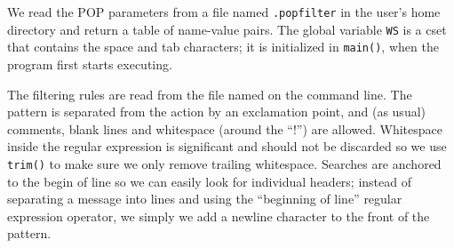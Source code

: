 We read the POP parameters from a file named \texttt{.popfilter} in the
user's home directory and return a table of name-value
pairs. The global variable \texttt{WS} is a cset that contains the
space and tab characters; it is initialized in \texttt{main()}, when
the program first starts executing.


The filtering rules are read from the file named on the command line.
The pattern is separated from the action by an exclamation point, and
(as usual) comments, blank lines and whitespace (around the
{\textquotedblleft}!{\textquotedblright}) are allowed. Whitespace
inside the regular expression is significant and should not be
discarded so we use \texttt{trim()} to make sure we only remove
trailing whitespace. Searches are anchored to the begin of line so we
can easily look for individual headers; instead of separating a message
into lines and using the {\textquotedblleft}beginning of
line{\textquotedblright} regular expression operator, we simply we add
a newline character to the front of the pattern.

